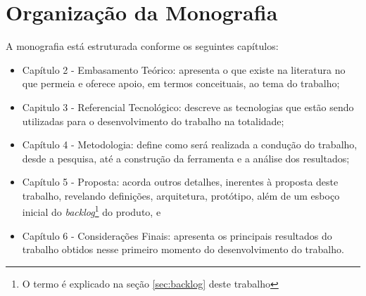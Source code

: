 \section{Organização da Monografia}

\label{ref:organizacao}

A monografia está estruturada conforme os seguintes capítulos:

\begin{itemize}
    \item Capítulo 2 - Embasamento Teórico: apresenta o que existe na literatura no que permeia e oferece apoio, em termos conceituais, ao tema do trabalho;
    \item Capitulo 3 - Referencial Tecnológico: descreve as tecnologias que estão sendo utilizadas para o desenvolvimento do trabalho na totalidade;
    \item Capítulo 4 - Metodologia: define como será realizada a condução do trabalho, desde a pesquisa, até a construção da ferramenta e a análise dos resultados;
    \item Capítulo 5 - Proposta: acorda outros detalhes, inerentes à proposta deste trabalho, revelando definições, arquitetura, protótipo, além de um esboço inicial do \textit{backlog}\footnote{O termo é explicado na seção \ref{sec:backlog} deste trabalho} do produto, e
    \item Capítulo 6 - Considerações Finais: apresenta os principais resultados do trabalho obtidos nesse primeiro momento do desenvolvimento do trabalho.
\end{itemize}